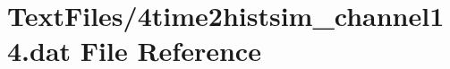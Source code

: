 \hypertarget{4time2histsim__channel14_8dat}{}\section{Text\+Files/4time2histsim\+\_\+channel14.dat File Reference}
\label{4time2histsim__channel14_8dat}
